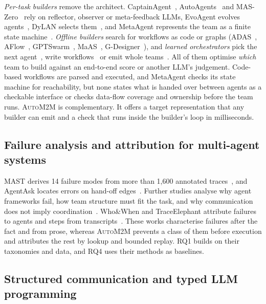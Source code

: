 \documentclass[pdflatex,sn-mathphys-num]{sn-jnl}
\theoremstyle{thmstyleone}%
\theoremstyle{thmstyletwo}%
\theoremstyle{thmstylethree}%
\newcommand{\auto}{\textsc{AutoM2M}}
\begin{document}
\emph{Per-task builders} remove the architect. CaptainAgent~\cite{song2024captain},
AutoAgents~\cite{chen2024autoagents} and MAS-Zero~\cite{ke2025maszero} rely on
reflector, observer or meta-feedback LLMs, EvoAgent evolves
agents~\cite{yuan2025evoagent}, DyLAN selects them~\cite{liu2024dylan}, and
MetaAgent represents the team as a finite state machine~\cite{zhang2025metaagent}.
\emph{Offline builders} search for workflows as code or graphs
(ADAS~\cite{hu2025adas}, AFlow~\cite{zhang2025aflow},
GPTSwarm~\cite{zhuge2024gptswarm}, MaAS~\cite{zhang2025maas},
G-Designer~\cite{zhang2025gdesigner}), and \emph{learned orchestrators} pick the
next agent~\cite{dang2025puppeteer}, write workflows~\cite{nielsen2026conductor}
or emit whole teams~\cite{ke2026masorchestra,yang2025agentnet,ma2026ann,he2026tpgo}.
All of them optimise \emph{which} team to build against an end-to-end score or
another LLM's judgement. Code-based workflows are parsed and executed, and
MetaAgent checks its state machine for reachability, but none states what is
handed over between agents as a checkable interface or checks data-flow
coverage and ownership before the team runs. \auto{} is complementary. It
offers a target representation that any builder can emit and a check that runs
inside the builder's loop in milliseconds.

\subsection{Failure analysis and attribution for multi-agent systems}\label{sec:rw-failures}

MAST derives 14 failure modes from more than 1{,}600 annotated
traces~\cite{cemri2025mast}, and AgentAsk locates errors on hand-off
edges~\cite{lin2026agentask}. Further studies analyse why agent frameworks
fail, how team structure must fit the task, and why communication does not
imply
coordination~\cite{lu2025exploring,kim2025scaling,pappu2026experts,zhang2026silobench,zhu2025multiagentbench,lamalfa2025miss}.
Who\&When and TraceElephant attribute failures to agents and steps from
transcripts~\cite{zhang2025whowhen,chen2026traceelephant}. These works
characterise failures after the fact and from prose, whereas \auto{} prevents a
class of them before execution and attributes the rest by lookup and bounded
replay. RQ1 builds on their taxonomies and data, and RQ4 uses their methods as
baselines.

\subsection{Structured communication and typed LLM programming}\label{sec:rw-structured}
\end{document}
